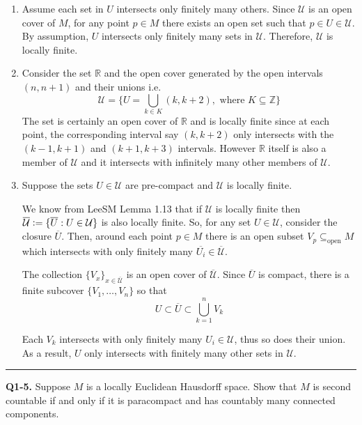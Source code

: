 \documentclass{article}
\newcommand{\R}{\mathbb{R}}
\newcommand{\defeq}{\vcentcolon=}
\begin{document}
\begin{enumerate}[label=(\alph*)]
  \item Assume each set in $U$ intersects only finitely many others. Since $\mathcal U$ is an open cover of $M$, for any point $p \in M$ there exists an open set such that $p \in U \in \mathcal U$. By assumption, $U$ intersects only finitely many sets in $\mathcal U$. Therefore, $\mathcal U$ is locally finite.
  
  \vskip 0.5cm
  \item Consider the set $\R$ and the open cover generated by the open intervals $(n, n+1)$ and their unions i.e. 
  \[ \mathcal U = \{ U = \bigcup_{k \in K} (k, k+2), \text{ where $K \subseteq \mathbb{Z}$} \} \]
  The set is certainly an open cover of $\R$ and is locally finite since at each point, the corresponding interval say $(k, k+2)$ only intersects with the $(k - 1, k+1)$ and $(k+1, k+3)$ intervals. However $\R$ itself is also a member of $\mathcal U$ and it intersects with infinitely many other members of $\mathcal U$.
  
  \vskip 0.5cm
  \item Suppose the sets $U \in \mathcal{U}$ are pre-compact and $\mathcal{U}$ is locally finite. 
  
  \vskip 0.25cm
  We know from LeeSM Lemma 1.13 that if $\mathcal{U}$ is locally finite then $\overline{\mathcal{U}} \defeq \{ \overline{U} : U \in \mathcal{U} \}$ is also locally finite. So, for any set $U \in \mathcal{U}$, consider the closure $\overline{U}$. Then, around each point $p \in M$ there is an open subset $V_p \subseteq_{\text{open}} M$ which intersects with only finitely many $\overline{U_i} \in \overline{\mathcal{U}}$. 

  \vskip 0.25cm
  The collection $\{V_{x}\}_{x \in \overline{\mathcal{U}}}$ is an open cover of $\overline{\mathcal{U}}$. Since $\overline{U}$ is compact, there is a finite subcover $\{V_1, \dots, V_n\}$ so that 
  \[ U \subset \overline{U} \subset \bigcup_{k = 1}^n V_k \]

  Each $V_k$ intersects with only finitely many $U_i \in \mathcal{U}$, thus so does their union. As a result, $U$ only intersects with finitely many other sets in $\mathcal{U}$.
\end{enumerate}

\vskip 0.5cm
\hrule 
\vskip 0.5cm

\textbf{Q1-5.} Suppose $M$ is a locally Euclidean Hausdorff space. Show that $M$ is second countable if and only if it is paracompact and has countably many connected components.
\end{document}
